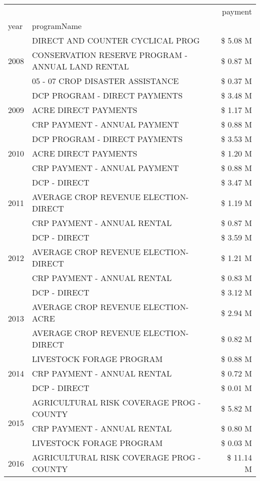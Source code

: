 \begin{tabular}{llr}
\toprule
 &  & payment \\
year & programName &  \\
\midrule
\multirow[t]{3}{*}{2008} & DIRECT AND COUNTER CYCLICAL PROG & \$ 5.08 M \\
 & CONSERVATION RESERVE PROGRAM - ANNUAL LAND RENTAL & \$ 0.87 M \\
 & 05 - 07 CROP DISASTER ASSISTANCE & \$ 0.37 M \\
\cline{1-3}
\multirow[t]{3}{*}{2009} & DCP PROGRAM - DIRECT PAYMENTS & \$ 3.48 M \\
 & ACRE DIRECT PAYMENTS & \$ 1.17 M \\
 & CRP PAYMENT - ANNUAL PAYMENT & \$ 0.88 M \\
\cline{1-3}
\multirow[t]{3}{*}{2010} & DCP PROGRAM - DIRECT PAYMENTS & \$ 3.53 M \\
 & ACRE DIRECT PAYMENTS & \$ 1.20 M \\
 & CRP PAYMENT - ANNUAL PAYMENT & \$ 0.88 M \\
\cline{1-3}
\multirow[t]{3}{*}{2011} & DCP - DIRECT & \$ 3.47 M \\
 & AVERAGE CROP REVENUE ELECTION-DIRECT & \$ 1.19 M \\
 & CRP PAYMENT - ANNUAL RENTAL & \$ 0.87 M \\
\cline{1-3}
\multirow[t]{3}{*}{2012} & DCP - DIRECT & \$ 3.59 M \\
 & AVERAGE CROP REVENUE ELECTION-DIRECT & \$ 1.21 M \\
 & CRP PAYMENT - ANNUAL RENTAL & \$ 0.83 M \\
\cline{1-3}
\multirow[t]{3}{*}{2013} & DCP - DIRECT & \$ 3.12 M \\
 & AVERAGE CROP REVENUE ELECTION-ACRE & \$ 2.94 M \\
 & AVERAGE CROP REVENUE ELECTION-DIRECT & \$ 0.82 M \\
\cline{1-3}
\multirow[t]{3}{*}{2014} & LIVESTOCK FORAGE PROGRAM & \$ 0.88 M \\
 & CRP PAYMENT - ANNUAL RENTAL & \$ 0.72 M \\
 & DCP - DIRECT & \$ 0.01 M \\
\cline{1-3}
\multirow[t]{3}{*}{2015} & AGRICULTURAL RISK COVERAGE PROG - COUNTY & \$ 5.82 M \\
 & CRP PAYMENT - ANNUAL RENTAL & \$ 0.80 M \\
 & LIVESTOCK FORAGE PROGRAM & \$ 0.03 M \\
\cline{1-3}
\multirow[t]{3}{*}{2016} & AGRICULTURAL RISK COVERAGE PROG - COUNTY & \$ 11.14 M \\

\end{tabular}
